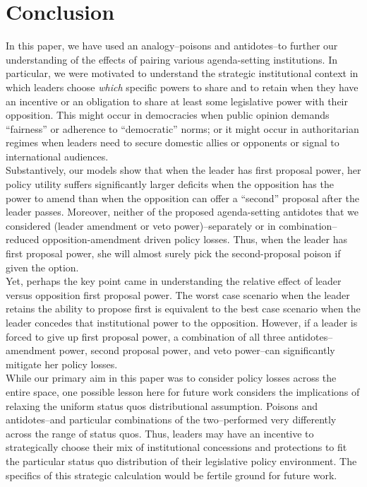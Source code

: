 \documentclass[12pt]{article}
\theoremstyle{plain}		      \newtheorem{assn}{Assumption}
\theoremstyle{plain}		      \newtheorem{prop}{Proposition}
\theoremstyle{plain}		      \newtheorem{lemma}{Lemma}
\theoremstyle{plain}	          \newtheorem{imp}{Implication}
\theoremstyle{plain}	          \newtheorem{hyp}{Hypothesis}
\theoremstyle{definition}		  \newtheorem{defn}{Definition}
\theoremstyle{remark}	          \newtheorem{rem}{Remark}
\theoremstyle{definition}         \newtheorem{case}{Case}
\begin{document}
\section{Conclusion}
\indent In this paper, we have used an analogy--poisons and antidotes--to further our understanding of the effects of pairing various agenda-setting institutions. In particular, we were motivated to understand the strategic institutional context in which leaders choose \textit{which} specific powers to share and to retain when they have an incentive or an obligation to share at least some legislative power with their opposition. This might occur in democracies when public opinion demands ``fairness'' or adherence to ``democratic'' norms; or it might occur in authoritarian regimes when leaders need to secure domestic allies or opponents or signal to international audiences.
\\ 
\indent Substantively, our models show that when the leader has first proposal power, her policy utility suffers significantly larger deficits when the opposition has the power to amend than when the opposition can offer a ``second'' proposal after the leader passes. Moreover, neither of the proposed agenda-setting antidotes that we considered (leader amendment or veto power)--separately or in combination--reduced opposition-amendment driven policy losses. Thus, when the leader has first proposal power, she will almost surely pick the second-proposal poison if given the option. 
\\
\indent Yet, perhaps the key point came in understanding the relative effect of leader versus opposition first proposal power. The worst case scenario when the leader retains the ability to propose first is equivalent to the best case scenario when the leader concedes that institutional power to the opposition. However, if a leader is forced to give up first proposal power, a combination of all three antidotes--amendment power, second proposal power, and veto power--can significantly mitigate her policy losses.
\\
\indent While our primary aim in this paper was to consider policy losses across the entire space, one possible lesson here for future work considers the implications of relaxing the uniform status quos distributional assumption. Poisons and antidotes--and particular combinations of the two--performed very differently across the range of status quos. Thus, leaders may have an incentive to strategically choose their mix of institutional concessions and protections to fit the particular status quo distribution of their legislative policy environment. The specifics of this strategic calculation would be fertile ground for future work.
\end{document}
